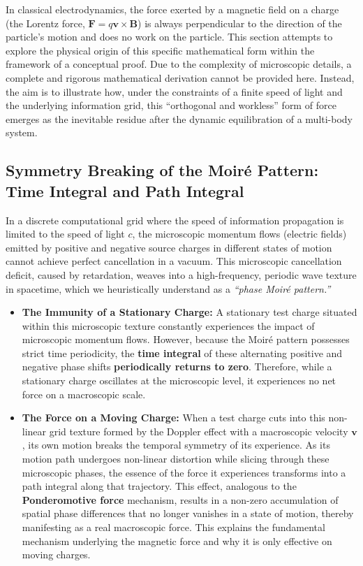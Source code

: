 \documentclass[12pt, a4paper]{article}
\begin{document}
In classical electrodynamics, the force exerted by a magnetic field on a charge (the Lorentz force, $\bm{F} = q\bm{v} \times \bm{B}$) is always perpendicular to the direction of the particle's motion and does no work on the particle. This section attempts to explore the physical origin of this specific mathematical form within the framework of a conceptual proof. Due to the complexity of microscopic details, a complete and rigorous mathematical derivation cannot be provided here. Instead, the aim is to illustrate how, under the constraints of a finite speed of light and the underlying information grid, this ``orthogonal and workless'' form of force emerges as the inevitable residue after the dynamic equilibration of a multi-body system.

\subsection{Symmetry Breaking of the Moiré Pattern: Time Integral and Path Integral}

In a discrete computational grid where the speed of information propagation is limited to the speed of light $c$, the microscopic momentum flows (electric fields) emitted by positive and negative source charges in different states of motion cannot achieve perfect cancellation in a vacuum. This microscopic cancellation deficit, caused by retardation, weaves into a high-frequency, periodic wave texture in spacetime, which we heuristically understand as a \textit{``phase Moiré pattern.''}

\begin{itemize}
    \item \textbf{The Immunity of a Stationary Charge:} A stationary test charge situated within this microscopic texture constantly experiences the impact of microscopic momentum flows. However, because the Moiré pattern possesses strict time periodicity, the \textbf{time integral} of these alternating positive and negative phase shifts \textbf{periodically returns to zero}.
    Therefore, while a stationary charge oscillates at the microscopic level, it experiences no net force on a macroscopic scale.

    \item \textbf{The Force on a Moving Charge:} When a test charge cuts into this non-linear grid texture formed by the Doppler effect with a macroscopic velocity $\bm{v}$, its own motion breaks the temporal symmetry of its experience. As its motion path undergoes non-linear distortion while slicing through these microscopic phases, the essence of the force it experiences transforms into a path integral along that trajectory. This effect, analogous to the \textbf{Ponderomotive force} mechanism, results in a non-zero accumulation of spatial phase differences that no longer vanishes in a state of motion, thereby manifesting as a real macroscopic force. This explains the fundamental mechanism underlying the magnetic force and why it is only effective on moving charges.
\end{itemize}
\end{document}
